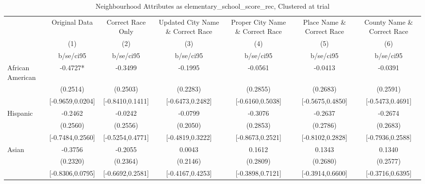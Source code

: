 \documentclass{article}
\begin{document}
\begin{table}[htbp]\centering
\def\sym#1{\ifmmode^{#1}\else\(^{#1}\)\fi}
\caption{Neighbourhood Attributes as elementary\_school\_score\_rec, Clustered at trial}
\begin{tabular}{l*{6}{c}}
\toprule
                    &\multicolumn{1}{c}{Original Data}&\multicolumn{1}{c}{Correct Race Only}&\multicolumn{1}{c}{Updated City Name \& Correct Race}&\multicolumn{1}{c}{Proper City Name \& Correct Race}&\multicolumn{1}{c}{Place Name \& Correct Race}&\multicolumn{1}{c}{County Name \& Correct Race}\\\cmidrule(lr){2-2}\cmidrule(lr){3-3}\cmidrule(lr){4-4}\cmidrule(lr){5-5}\cmidrule(lr){6-6}\cmidrule(lr){7-7}
                    &\multicolumn{1}{c}{(1)}   &\multicolumn{1}{c}{(2)}   &\multicolumn{1}{c}{(3)}   &\multicolumn{1}{c}{(4)}   &\multicolumn{1}{c}{(5)}   &\multicolumn{1}{c}{(6)}   \\
                    &   b/se/ci95   &   b/se/ci95   &   b/se/ci95   &   b/se/ci95   &   b/se/ci95   &   b/se/ci95   \\
\midrule
African American    &     -0.4727*  &     -0.3499   &     -0.1995   &     -0.0561   &     -0.0413   &     -0.0391   \\
                    &    (0.2514)   &    (0.2503)   &    (0.2283)   &    (0.2855)   &    (0.2683)   &    (0.2591)   \\
                    &[-0.9659,0.0204]   &[-0.8410,0.1411]   &[-0.6473,0.2482]   &[-0.6160,0.5038]   &[-0.5675,0.4850]   &[-0.5473,0.4691]   \\
Hispanic            &     -0.2462   &     -0.0242   &     -0.0799   &     -0.3076   &     -0.2637   &     -0.2674   \\
                    &    (0.2560)   &    (0.2556)   &    (0.2050)   &    (0.2853)   &    (0.2786)   &    (0.2683)   \\
                    &[-0.7484,0.2560]   &[-0.5254,0.4771]   &[-0.4819,0.3222]   &[-0.8673,0.2521]   &[-0.8102,0.2828]   &[-0.7936,0.2588]   \\
Asian               &     -0.3756   &     -0.2055   &      0.0043   &      0.1612   &      0.1343   &      0.1340   \\
                    &    (0.2320)   &    (0.2364)   &    (0.2146)   &    (0.2809)   &    (0.2680)   &    (0.2577)   \\
                    &[-0.8306,0.0795]   &[-0.6692,0.2581]   &[-0.4167,0.4253]   &[-0.3898,0.7121]   &[-0.3914,0.6600]   &[-0.3716,0.6395]   \\

\end{tabular}
\end{table}
\end{document}

